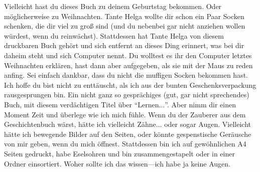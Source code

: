Vielleicht hast du dieses Buch zu deinem Geburtstag bekommen. Oder möglicherweise zu Weihnachten. Tante Helga wollte dir schon ein Paar Socken schenken, die dir viel zu groß sind (und du nebenbei gar nicht anziehen wollen würdest, wenn du reinwächst). Stattdessen hat Tante Helga von diesem druckbaren Buch gehört und sich entfernt an dieses Ding erinnert, was bei dir daheim steht und sich Computer nennt. Du wolltest es ihr den Computer letztes Weihnachten erklären, hast dann aber aufgegeben, als sie mit der Maus zu reden anfing. Sei einfach dankbar, dass du nicht die muffigen Socken bekommen hast.
Ich hoffe du bist nicht zu enttäuscht, als ich aus der bunten Geschenksverpackung rausgesprungen bin. Ein nicht ganz so gesprächiges (gut, gar nicht sprechendes) Buch, mit diesem verdächtigen Titel über ``Lernen$\ldots$''.
Aber nimm dir einen Moment Zeit und überlege wie ich mich fühle. Wenn du der Zauberer aus dem Geschichtenbuch wärst, hätte ich vielleicht Zähne... oder sogar Augen. Vielleicht hätte ich bewegende Bilder auf den Seiten, oder könnte gespenstische Geräusche von mir geben, wenn du mich öffnest. Stattdessen bin ich auf gewöhnlichen A4 Seiten gedruckt, habe Eselsohren und bin zusammengestapelt oder in einer Ordner einsortiert. Woher sollte ich das wissen---ich habe ja keine Augen. 
\\
\\
